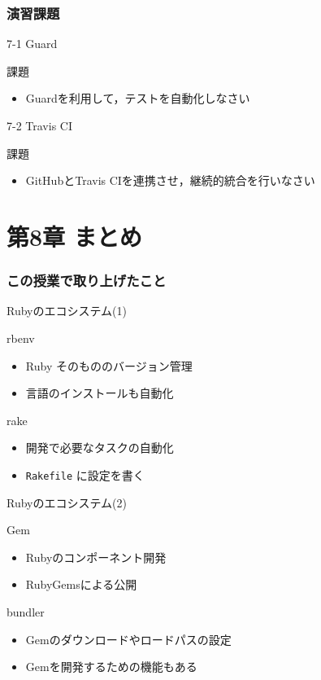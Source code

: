\documentclass[t, aspectratio=169]{beamer}
\begin{document}
\section{演習課題}
\label{sec-7-3}
\begin{frame}[label=sec-7-3-1]{7-1 Guard}
\begin{block}{課題}
\begin{itemize}
\item Guardを利用して，テストを自動化しなさい
\end{itemize}
\end{block}
\end{frame}
\begin{frame}[label=sec-7-3-2]{7-2 Travis CI}
\begin{block}{課題}
\begin{itemize}
\item GitHubとTravis CIを連携させ，継続的統合を行いなさい
\end{itemize}
\end{block}
\end{frame}
\part{第8章 まとめ}
\label{sec-8}
\section{この授業で取り上げたこと}
\label{sec-8-1}
\begin{frame}[fragile,label=sec-8-1-1]{Rubyのエコシステム(1)}
 \begin{block}{rbenv}
\begin{itemize}
\item Ruby そのもののバージョン管理
\item 言語のインストールも自動化
\end{itemize}
\end{block}
\begin{block}{rake}
\begin{itemize}
\item 開発で必要なタスクの自動化
\item \texttt{Rakefile} に設定を書く
\end{itemize}
\end{block}
\end{frame}

\begin{frame}[label=sec-8-1-2]{Rubyのエコシステム(2)}
\begin{block}{Gem}
\begin{itemize}
\item Rubyのコンポーネント開発
\item RubyGemsによる公開
\end{itemize}
\end{block}
\begin{block}{bundler}
\begin{itemize}
\item Gemのダウンロードやロードパスの設定
\item Gemを開発するための機能もある
\end{itemize}
\end{block}
\end{frame}
\end{document}
